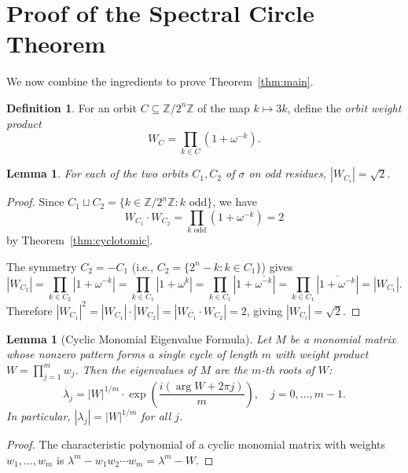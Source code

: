 \documentclass[11pt,reqno]{amsart}
\newtheorem{lemma}[theorem]{Lemma}
\theoremstyle{definition}
\newtheorem{definition}[theorem]{Definition}
\begin{document}
\section{Proof of the Spectral Circle Theorem}

We now combine the ingredients to prove Theorem~\ref{thm:main}.

\begin{definition}
For an orbit $C \subseteq \mathbb{Z}/2^n\mathbb{Z}$ of the map $k \mapsto 3k$, define the \emph{orbit weight product}
\[
W_C = \prod_{k \in C} (1 + \omega^{-k}).
\]
\end{definition}

\begin{lemma}\label{lem:orbit-weight}
For each of the two orbits $C_1, C_2$ of $\sigma$ on odd residues, $|W_{C_i}| = \sqrt{2}$.
\end{lemma}

\begin{proof}
Since $C_1 \sqcup C_2 = \{k \in \mathbb{Z}/2^n\mathbb{Z} : k \text{ odd}\}$, we have
\[
W_{C_1} \cdot W_{C_2} = \prod_{k \text{ odd}} (1 + \omega^{-k}) = 2
\]
by Theorem~\ref{thm:cyclotomic}.

The symmetry $C_2 = -C_1$ (i.e., $C_2 = \{2^n - k : k \in C_1\}$) gives
\[
|W_{C_2}| = \prod_{k \in C_2} |1 + \omega^{-k}| = \prod_{k \in C_1} |1 + \omega^{k}| = \prod_{k \in C_1} |1 + \overline{\omega^{-k}}| = \prod_{k \in C_1} |\overline{1 + \omega^{-k}}| = |W_{C_1}|.
\]
Therefore $|W_{C_1}|^2 = |W_{C_1}| \cdot |W_{C_2}| = |W_{C_1} \cdot W_{C_2}| = 2$, giving $|W_{C_i}| = \sqrt{2}$.
\end{proof}

\begin{lemma}[Cyclic Monomial Eigenvalue Formula]\label{lem:cyclic-monomial}
Let $M$ be a monomial matrix whose nonzero pattern forms a single cycle of length $m$ with weight product $W = \prod_{j=1}^{m} w_j$. Then the eigenvalues of $M$ are the $m$-th roots of $W$:
\[
\lambda_j = |W|^{1/m} \cdot \exp\!\left(\frac{i(\arg W + 2\pi j)}{m}\right), \quad j = 0, \ldots, m-1.
\]
In particular, $|\lambda_j| = |W|^{1/m}$ for all $j$.
\end{lemma}

\begin{proof}
The characteristic polynomial of a cyclic monomial matrix with weights $w_1, \ldots, w_m$ is $\lambda^m - w_1 w_2 \cdots w_m = \lambda^m - W$.
\end{proof}
\end{document}
